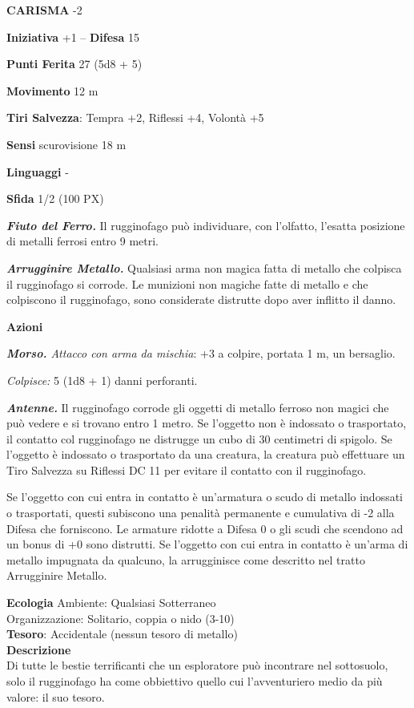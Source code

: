 \begin{multicols}{2}
\textbf{CARISMA} -2

\textbf{Iniziativa} +1 -- \textbf{Difesa} 15

\textbf{Punti Ferita} 27 (5d8 + 5)

\textbf{Movimento} 12 m

\textbf{Tiri Salvezza}: Tempra +2, Riflessi +4, Volontà +5

\textbf{Sensi} scurovisione 18 m

\textbf{Linguaggi} -

\textbf{Sfida} 1/2 (100 PX)

\textit{\textbf{Fiuto del Ferro.}} Il rugginofago può individuare, con l'olfatto, l'esatta posizione di metalli ferrosi entro 9 metri.

\textit{\textbf{Arrugginire Metallo.}} Qualsiasi arma non magica fatta di metallo che colpisca il rugginofago si corrode. Le munizioni non magiche fatte di metallo e che colpiscono il rugginofago, sono considerate distrutte dopo aver inflitto il danno.

\textbf{Azioni}

\textit{\textbf{Morso.} Attacco con arma da mischia}: +3 a colpire, portata 1 m, un bersaglio.

\textit{Colpisce:} 5 (1d8 + 1) danni perforanti.

\textit{\textbf{Antenne.}} Il rugginofago corrode gli oggetti di metallo ferroso non magici che può vedere e si trovano entro 1 metro. Se l'oggetto non è indossato o trasportato, il contatto col rugginofago ne distrugge un cubo di 30 centimetri di spigolo. Se l'oggetto è indossato o trasportato da una creatura, la creatura può effettuare un Tiro Salvezza su Riflessi DC 11 per evitare il contatto con il rugginofago.

Se l'oggetto con cui entra in contatto è un'armatura o scudo di metallo indossati o trasportati, questi subiscono una penalità permanente e cumulativa di -2 alla Difesa che forniscono. Le armature ridotte a Difesa 0 o gli scudi che scendono ad un bonus di +0 sono distrutti. Se l'oggetto con cui entra in contatto è un'arma di metallo impugnata da qualcuno, la arrugginisce come descritto nel tratto Arrugginire Metallo.

\textbf{Ecologia}
Ambiente: Qualsiasi Sotterraneo\\
Organizzazione: Solitario, coppia o nido (3-10)\\
\textbf{Tesoro}: Accidentale (nessun tesoro di metallo)\\
\textbf{Descrizione}\\
Di tutte le bestie terrificanti che un esploratore può incontrare nel sottosuolo, solo il rugginofago ha come obbiettivo quello cui l'avventuriero medio da più valore: il suo tesoro.


\end{multicols}
